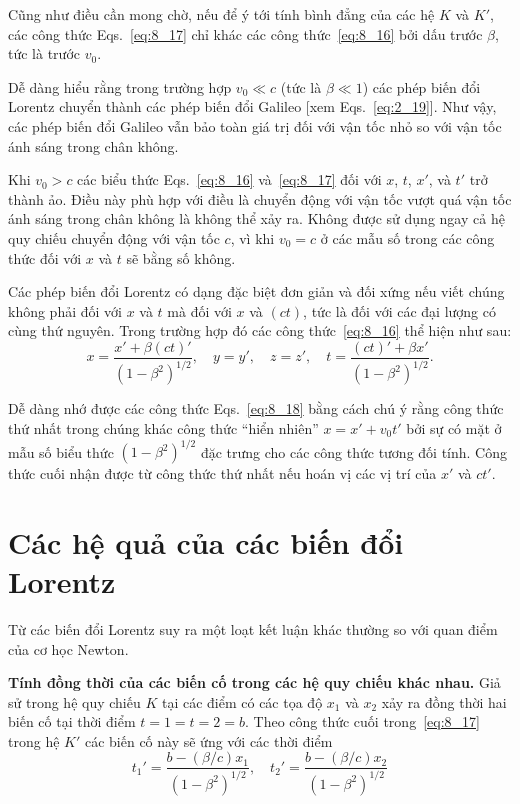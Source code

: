 Cũng như điều cần mong chờ, nếu để ý tới tính bình đẳng của các hệ $K$ và $K'$, các công thức Eqs.~\eqref{eq:8_17} chỉ khác các công thức~\eqref{eq:8_16} bởi dấu trước $\beta$, tức là trước $v_0$.

Dễ dàng hiểu rằng trong trường hợp $v_0\ll c$ (tức là $\beta\ll 1$) các phép biến đổi Lorentz chuyển thành các phép biến đổi Galileo [xem Eqs.~\eqref{eq:2_19}]. Như vậy, các phép biến đổi Galileo vẫn bảo toàn giá trị đối với vận tốc nhỏ so với vận tốc ánh sáng trong chân không.

Khi $v_0>c$ các biểu thức Eqs.~\eqref{eq:8_16} và~\eqref{eq:8_17} đối với $x$, $t$, $x'$, và $t'$ trở thành ảo. Điều này phù hợp với điều là chuyển động với vận tốc vượt quá vận tốc ánh sáng trong chân không là không thể xảy ra. Không được sử dụng ngay cả hệ quy chiếu chuyển động với vận tốc $c$, vì khi $v_0=c$ ở các mẫu số trong các công thức đối với $x$ và $t$ sẽ bằng số không.

Các phép biến đổi Lorentz có dạng đặc biệt đơn giản và đối xứng nếu viết chúng không phải đối với $x$ và $t$ mà đối với $x$ và $(ct)$, tức là đối với các đại lượng có cùng thứ nguyên. Trong trường hợp đó các công thức~\eqref{eq:8_16} thể hiện như sau:
\begin{equation}\label{eq:8_18}
	x = \frac{x' + \beta (ct)'}{\left(1 - \beta^2\right)^{1/2}},\quad y = y',\quad z = z',\quad t = \frac{(ct)' + \beta x'}{\left(1 - \beta^2\right)^{1/2}}.
\end{equation}

Dễ dàng nhớ được các công thức Eqs.~\eqref{eq:8_18} bằng cách chú ý rằng công thức thứ nhất trong chúng khác công thức ``hiển nhiên'' $x=x'+v_0t'$ bởi sự có mặt ở mẫu số biểu thức $\left(1 - \beta^2\right)^{1/2}$ đặc trưng cho các công thức tương đối tính. Công thức cuối nhận được từ công thức thứ nhất nếu hoán vị các vị trí của $x'$ và $ct'$.

\section{Các hệ quả của các biến đổi Lorentz}\label{sec:8_3}

Từ các biến đổi Lorentz suy ra một loạt kết luận khác thường so với quan điểm của cơ học Newton.

\textbf{Tính đồng thời của các biến cố trong các hệ quy chiếu khác nhau.} Giả sử trong hệ quy chiếu $K$ tại các điểm có các tọa độ $x_1$ và $x_2$ xảy ra đồng thời hai biến cố tại thời điểm $t=1=t=2=b$. Theo công thức cuối trong~\eqref{eq:8_17} trong hệ $K'$ các biến cố này sẽ ứng với các thời điểm
\begin{equation*}
	t_1' = \frac{b - (\beta/c) x_1}{\left(1 - \beta^2\right)^{1/2}},\quad t_2' = \frac{b - (\beta/c) x_2}{\left(1 - \beta^2\right)^{1/2}}
\end{equation*}

